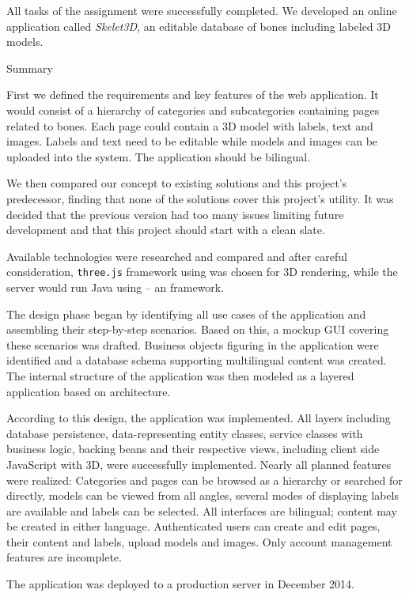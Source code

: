 All tasks of the assignment were successfully completed. We developed an online application called {\it Skelet3D}, an editable database of bones including labeled 3D models.

\sec Summary

First we defined the requirements and key features of the web application. It would consist of a hierarchy of categories and subcategories containing pages related to bones. Each page could contain a 3D model with labels, text and images. Labels and text need to be editable while models and images can be uploaded into the system. The application should be bilingual.

We then compared our concept to existing solutions and this project’s predecessor, finding that none of the solutions cover this project’s utility. It was decided that the previous version had too many issues limiting future development and that this project should start with a clean slate.

Available technologies were researched and compared and after careful consideration, {\tt three.js} framework using  was chosen for 3D rendering, while the server would run Java  using  -- an  framework.

The design phase began by identifying all use cases of the application and assembling their step-by-step scenarios. Based on this, a mockup GUI covering these scenarios was drafted. Business objects figuring in the application were identified and a database schema supporting multilingual content was created. The internal structure of the application was then modeled as a layered application based on  architecture.

According to this design, the application was implemented. All layers including database persistence, data-representing entity classes, service classes with business logic, backing beans and their respective  views, including client side JavaScript with 3D, were successfully implemented. Nearly all planned features were realized: Categories and pages can be browsed as a hierarchy or searched for directly, models can be viewed from all angles, several modes of displaying labels are available and labels can be selected. All interfaces are bilingual; content may be created in either language. Authenticated users can create and edit pages, their content and labels, upload models and images. Only account management features are incomplete.

The application was deployed to a production server in December 2014.

